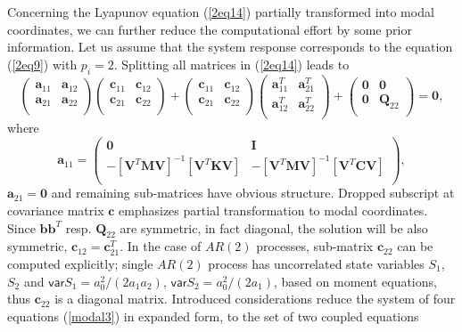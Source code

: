 \documentclass[preprint,12pt,authoryear]{elsarticle}
\newcommand{\bs}[1]{{\boldsymbol{#1}}}
\begin{document}
Concerning the Lyapunov equation (\ref{2eq14}) partially transformed into modal coordinates, we can further reduce the computational effort by some prior information. Let us assume that the system response corresponds to the equation (\ref{2eq9}) with $p_i=2$. Splitting all matrices in (\ref{2eq14}) leads to
\begin{equation}
\left(\begin{array}{cc}
\bs{a}_{11} & \bs{a}_{12} \\
\bs{a}_{21} & \bs{a}_{22} \\
\end{array}\right)
\left(\begin{array}{cc}
\bs{c}_{11} & \bs{c}_{12} \\
\bs{c}_{21} & \bs{c}_{22} \\
\end{array}\right)
+
\left(\begin{array}{cc}
\bs{c}_{11} & \bs{c}_{12} \\
\bs{c}_{21} & \bs{c}_{22} \\
\end{array}\right)
\left(\begin{array}{cc}
\bs{a}^T_{11} & \bs{a}^T_{21} \\
\bs{a}^T_{12} & \bs{a}^T_{22} \\
\end{array}\right)
+
\left(\begin{array}{cc}
\bs{0} & \bs{0} \\
\bs{0} & \bs{Q}_{22} \\
\end{array}\right)
=\bs{0},
\label{modal3}
\end{equation}
where
\begin{equation}
\bs{a}_{11}=\left(\begin{array}{cc}
\bs{0} & \bs{I} \\
-[\bs{V}^T\bs{M}\bs{V}]^{-1}[\bs{V}^T\bs{K}\bs{V}] & -[\bs{V}^T\bs{M}\bs{V}]^{-1}[\bs{V}^T\bs{C}\bs{V}] \\
\end{array}\right),
\label{modal4}
\end{equation}
$\bs{a}_{21}=\bs{0}$ and remaining sub-matrices have obvious structure. Dropped subscript at covariance matrix $\bs{c}$ emphasizes partial transformation to modal coordinates. Since $\bs{bb}^T$ resp. $\bs{Q}_{22}$ are symmetric, in fact diagonal, the solution will be also symmetric, $\bs{c}_{12}=\bs{c}^T_{21}$. In the case of $AR(2)$ processes, sub-matrix $\bs{c}_{22}$ can be computed explicitly; single $AR(2)$ process has uncorrelated state variables $S_1$, $S_2$ and $\mathsf{var}S_1=a_0^2/(2a_1a_2)$, $\mathsf{var}S_2=a_0^2/(2a_1)$, based on moment equations, thus $\bs{c}_{22}$ is a diagonal matrix. Introduced considerations reduce the system of four equations (\ref{modal3}) in expanded form, to the set of two coupled equations
\end{document}
